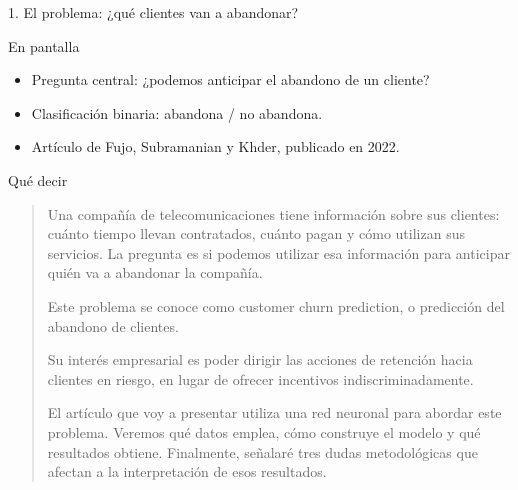 \documentclass[presentation]{beamer}
\begin{document}
\begin{frame}[label={sec:orgacb72de}]{1. El problema: ¿qué clientes van a abandonar?}
\begin{block}{En pantalla}
\begin{itemize}
\item Pregunta central: ¿podemos anticipar el abandono de un cliente?
\item Clasificación binaria: abandona / no abandona.
\item Artículo de Fujo, Subramanian y Khder, publicado en 2022.
\end{itemize}
\end{block}
\begin{block}{Qué decir}
\begin{quote}
Una compañía de telecomunicaciones tiene información sobre sus
clientes: cuánto tiempo llevan contratados, cuánto pagan y cómo
utilizan sus servicios. La pregunta es si podemos utilizar esa
información para anticipar quién va a abandonar la compañía.

Este problema se conoce como customer churn prediction, o predicción
del abandono de clientes.

Su interés empresarial es poder dirigir las acciones de retención
hacia clientes en riesgo, en lugar de ofrecer incentivos
indiscriminadamente.

El artículo que voy a presentar utiliza una red neuronal para abordar
este problema. Veremos qué datos emplea, cómo construye el modelo y
qué resultados obtiene. Finalmente, señalaré tres dudas metodológicas
que afectan a la interpretación de esos resultados.
\end{quote}
\end{block}
\end{frame}
\end{document}
